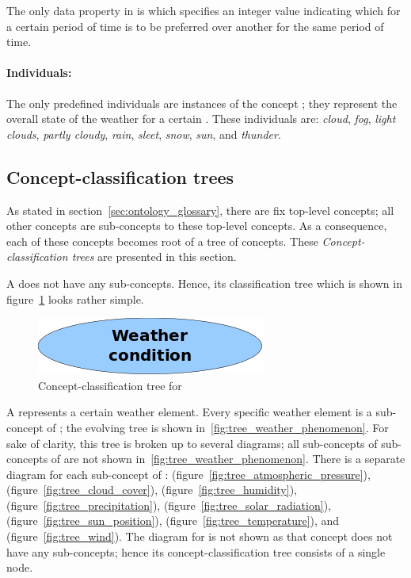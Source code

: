 The only data property in \thinkhomeweather is  which specifies an integer value indicating which  for a certain period of time is to be preferred over another  for the same period of time.

\paragraph{Individuals:}

The only predefined individuals are instances of the concept ; they represent the overall state of the weather for a certain . These individuals are: \emph{cloud}, \emph{fog}, \emph{light clouds}, \emph{partly cloudy}, \emph{rain}, \emph{sleet}, \emph{snow}, \emph{sun}, and \emph{thunder}.

\subsection{Concept-classification trees}
\label{sec:concept_classification_trees}

As stated in section~\ref{sec:ontology_glossary}, there are fix top-level concepts; all other concepts are sub-concepts to these top-level concepts. As a consequence, each of these concepts becomes root of a tree of concepts. These \emph{Concept-classification trees} are presented in this section.

A  does not have any sub-concepts. Hence, its classification tree which is shown in figure~\ref{fig:tree_weather_condition} looks rather simple.

\begin{figure}
  \centering
  \includegraphics[width=.3\textwidth]{figures/diagrams/weather-condition.png}
  \caption{Concept-classification tree for }
  \label{fig:tree_weather_condition}
\end{figure}

A  represents a certain weather element. Every specific weather element is a sub-concept of ; the evolving tree is shown in~\ref{fig:tree_weather_phenomenon}. For sake of clarity, this tree is broken up to several diagrams; all sub-concepts of sub-concepts of  are not shown in~\ref{fig:tree_weather_phenomenon}. There is a separate diagram for each sub-concept of :  (figure~\ref{fig:tree_atmospheric_pressure}),  (figure~\ref{fig:tree_cloud_cover}),  (figure~\ref{fig:tree_humidity}),  (figure~\ref{fig:tree_precipitation}),  (figure~\ref{fig:tree_solar_radiation}),  (figure~\ref{fig:tree_sun_position}),  (figure~\ref{fig:tree_temperature}), and  (figure~\ref{fig:tree_wind}). The diagram for  is not shown as that concept does not have any sub-concepts; hence its concept-classification tree consists of a single node.

